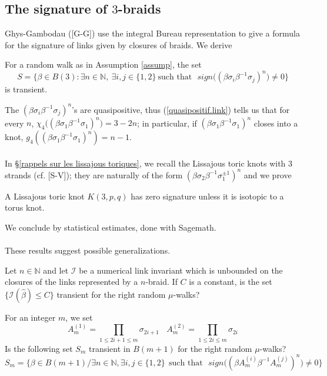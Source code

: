 \documentclass[12pt]{article}
\begin{document}
\subsection{The signature of $3$-braids}
Ghys-Gambodau ([G-G]) use the integral Bureau representation to give a formula for the signature of links given by closures of braids. We derive
\begin{prop}\label{thm sur les random walks}
	For a random walk as in Assumption \ref{assump}, the set
	\begin{equation}\label{definition de l'ensemble S}
	S=\{\beta\in B(3): \exists n\in\mathbb{N}, \ \exists i,j\in\{1,2\}\  \mbox{such that}\ \ \  
	sign\big((\beta\sigma_i\beta^{-1}\sigma_j)^n\big)\neq 0\}
	\end{equation}
		is transient. 
\end{prop}
The $(\beta\sigma_i\beta^{-1}\sigma_j)^n$'s are quasipositive, thus
 (\ref{quasipositif.link})  tells us that for every $n$, $\chi_4 \big((\beta\sigma_1\beta^{-1}\sigma_1)^n\big)=3-2n$; in particular, if $(\beta\sigma_1\beta^{-1}\sigma_1)^n$ closes into a knot, $g_4((\beta\sigma_1\beta^{-1}\sigma_1)^n)=n-1$.\\
\\
In \S \ref{rappels sur les lissajous toriques}, we recall the Lissajous toric knots with $3$ strands (cf. [S-V]); they are naturally of the form $(\beta\sigma_2\beta^{-1}\sigma_1^{\pm 1})^n$ and we prove
\begin{prop}\label{signature de lissajous}
	A Lissajous toric knot $K(3,p,q)$ has zero signature unless it is isotopic to a torus knot. 
\end{prop} 
We conclude by statistical estimates, done with Sagemath.\\
\\
These results suggest  possible generalizations.
\begin{ques}
	Let $n\in\mathbb{N}$ and let $\mathcal I$ be a numerical link invariant which is unbounded on the closures of the links represented by a $n$-braid. If $C$ is a constant, is the set $\{{\mathcal I}(\hat{\beta})\leq C\}$  transient for the right random $\mu$-walks?
\end{ques}

  \begin{ques}For an integer $m$, we set $$A_m^{(1)}=\prod_{1\leq 2i+1\leq m}\sigma_{2i+1}\ \ \ \ A_m^{(2)}=\prod_{1\leq 2i\leq m}\sigma_{2i}$$
  	Is the following set $S_m$ transient in $B(m+1)$ for the right random $\mu$-walks?
  	$$S_m=\{\beta\in B(m+1)\slash \exists n\in\mathbb{N}, \exists i,j\in\{1,2\}\ \  \mbox{such that}\ \ \  
  	sign\big((\beta A_m^{(i)}\beta^{-1} A_m^{(j)})^n\big)\neq 0\}$$
 \end{ques}
\end{document}
